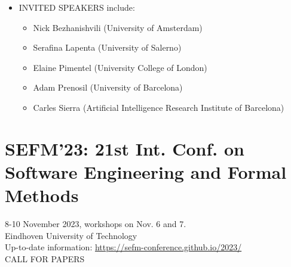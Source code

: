 \documentclass[prodmode,acmtecs]{acmsmall} %
\begin{document}
\begin{itemize}
\item  INVITED SPEAKERS include: 
 
\begin{itemize}\item  Nick Bezhanishvili (University of Amsterdam)
\item  Serafina Lapenta (University of Salerno)
\item  Elaine Pimentel (University College of London)
\item  Adam Prenosil (University of Barcelona)
\item  Carles Sierra (Artificial Intelligence Research Institute of Barcelona)
\end{itemize} 
\end{itemize}\section{SEFM'23: 21st Int. Conf. on Software Engineering and Formal Methods}\label{SEFM23}  8-10 November 2023, workshops on Nov. 6 and 7.\\ 
  Eindhoven University of Technology\\ 
  Up-to-date information: \href{https://sefm-conference.github.io/2023/}{https://sefm-conference.github.io/2023/}\\ 
CALL FOR PAPERS 
\end{document}
